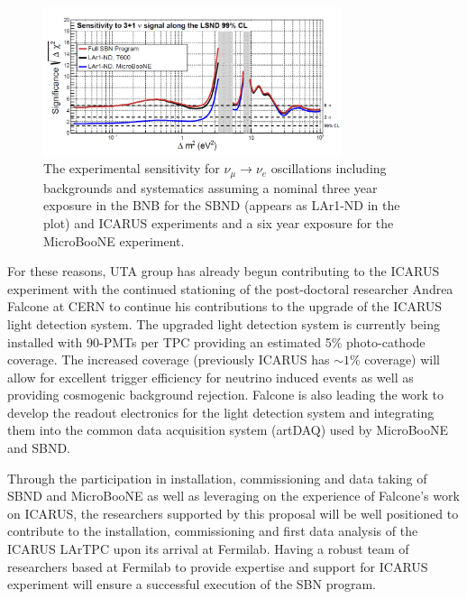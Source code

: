 \begin{figure}[htb]
\centering
\includegraphics[width=0.78\textwidth]{images/Sensitivity.png}
\caption[]{The experimental sensitivity for $\nu_{\mu} \rightarrow \nu_{e}$ oscillations including backgrounds and systematics assuming a nominal three year exposure in the BNB for the SBND (appears as LAr1-ND in the plot) and ICARUS experiments and a six year exposure for the MicroBooNE experiment.}
\label{fig:sense}
\end{figure}

For these reasons, UTA group has already begun contributing to the ICARUS experiment with the continued stationing of the post-doctoral researcher Andrea Falcone at CERN to continue his contributions to the upgrade of the ICARUS light detection system. The upgraded light detection system is currently being installed with 90-PMTs per TPC providing an estimated 5$\%$ photo-cathode coverage. The increased coverage (previously ICARUS has $\sim 1\%$ coverage) will allow for excellent trigger efficiency for neutrino induced events as well as providing cosmogenic background rejection. Falcone is also leading the work to develop the readout electronics for the light detection system and integrating them into the common data acquisition system (artDAQ) used by MicroBooNE and SBND.

\label{sec:ICARUSBulid}
Through the participation in installation, commissioning and data taking of SBND and MicroBooNE as well as leveraging on the experience of Falcone's work on ICARUS, the researchers supported by this proposal will be well positioned to contribute to the installation, commissioning and first data analysis of the ICARUS LArTPC upon its arrival at Fermilab. Having a robust team of researchers based at Fermilab to provide expertise and support for ICARUS experiment will ensure a successful execution of the SBN program.

